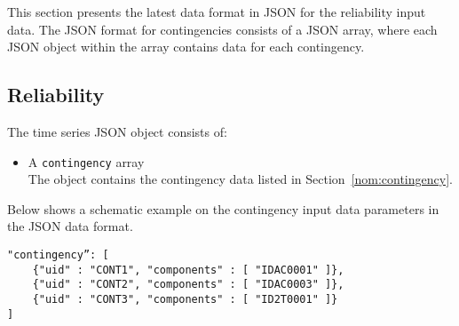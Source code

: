\label{sec:reliability}
This section presents the latest data format in JSON for the reliability input data.
The JSON format for contingencies consists of a JSON array,
where each JSON object within the array contains data for each contingency.

\subsection{Reliability}
\label{sec:reliability_data}
The time series JSON object consists of:
\begin{itemize}
    \item A \texttt{contingency} array\\
        The object contains the contingency data listed in Section~\ref{nom:contingency}.
\end{itemize}


Below shows a schematic example on the contingency input data parameters in the JSON data format.
\begin{verbatim}
"contingency”: [
    {"uid" : "CONT1", "components" : [ "IDAC0001" ]},
    {"uid" : "CONT2", "components" : [ "IDAC0003" ]},
    {"uid" : "CONT3", "components" : [ "ID2T0001" ]}
]
\end{verbatim}


